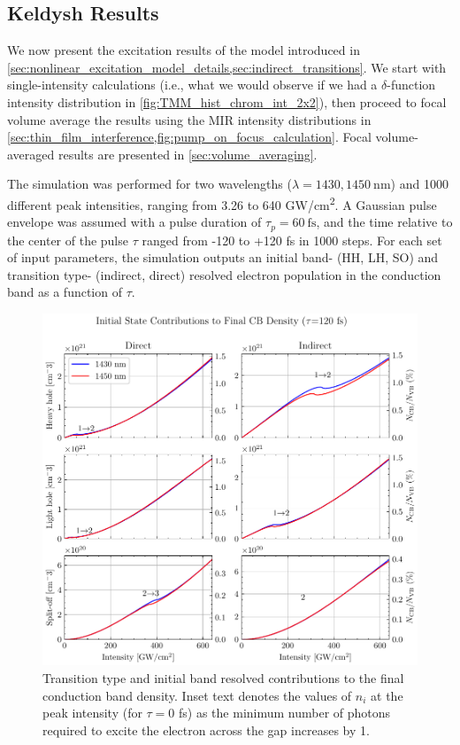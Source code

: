 \subsection{Keldysh Results}
\label{sec:nonlinear_excitation_results}

We now present the excitation results of the model introduced in \cref{sec:nonlinear_excitation_model_details,sec:indirect_transitions}. We start with single-intensity calculations (i.e., what we would observe if we had a $\delta$-function intensity distribution in \cref{fig:TMM_hist_chrom_int_2x2}), then proceed to focal volume average the results using the MIR intensity distributions in \cref{sec:thin_film_interference,fig:pump_on_focus_calculation}. Focal volume-averaged results are presented in \cref{sec:volume_averaging}.

The simulation was performed for two wavelengths ($\lambda = 1430, 1450 \ \textrm{nm}$) and 1000 different peak intensities, ranging from 3.26 to 640 GW/cm\textsuperscript{2}. A Gaussian pulse envelope was assumed with a pulse duration of $\tau_p = 60 \ \textrm{fs}$, and the time relative to the center of the pulse $\tau$ ranged from -120 to +120 fs in 1000 steps. For each set of input parameters, the simulation outputs an initial band- (HH, LH, SO) and transition type- (indirect, direct) resolved electron population in the conduction band as a function of $\tau$.

\begin{figure}
	\centering
	\includegraphics[width=1.0\textwidth]{figures/chap4/N_Channel_VB_resolved.pdf}
	\caption{Transition type and initial band resolved contributions to the final conduction band density. Inset text denotes the values of $n_i$ at the peak intensity (for $\tau=0$ fs) as the minimum number of photons required to excite the electron across the gap increases by 1.}
	\label{fig:N_Channel_VB_resolved}
\end{figure}

